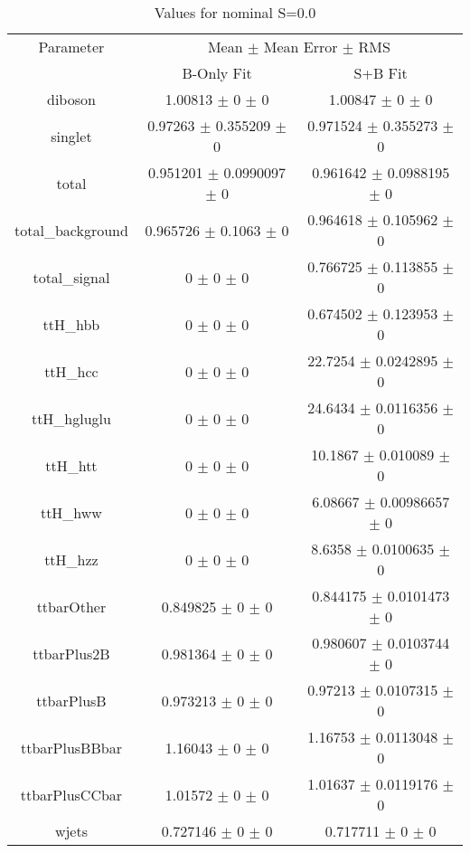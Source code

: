 \begin{table}
\centering
\caption{Values for nominal S=0.0}
\begin{tabular}{ccc}
\toprule
Parameter & \multicolumn{2}{c}{Mean $\pm$ Mean Error $\pm$ RMS}\\
 & B-Only Fit & S+B Fit\\
\midrule
diboson & \num{1.00813} $\pm$ \num{0} $\pm$ \num{0} & \num{1.00847} $\pm$ \num{0} $\pm$ \num{0}\\
singlet & \num{0.97263} $\pm$ \num{0.355209} $\pm$ \num{0} & \num{0.971524} $\pm$ \num{0.355273} $\pm$ \num{0}\\
total & \num{0.951201} $\pm$ \num{0.0990097} $\pm$ \num{0} & \num{0.961642} $\pm$ \num{0.0988195} $\pm$ \num{0}\\
total\_background & \num{0.965726} $\pm$ \num{0.1063} $\pm$ \num{0} & \num{0.964618} $\pm$ \num{0.105962} $\pm$ \num{0}\\
total\_signal & \num{0} $\pm$ \num{0} $\pm$ \num{0} & \num{0.766725} $\pm$ \num{0.113855} $\pm$ \num{0}\\
ttH\_hbb & \num{0} $\pm$ \num{0} $\pm$ \num{0} & \num{0.674502} $\pm$ \num{0.123953} $\pm$ \num{0}\\
ttH\_hcc & \num{0} $\pm$ \num{0} $\pm$ \num{0} & \num{22.7254} $\pm$ \num{0.0242895} $\pm$ \num{0}\\
ttH\_hgluglu & \num{0} $\pm$ \num{0} $\pm$ \num{0} & \num{24.6434} $\pm$ \num{0.0116356} $\pm$ \num{0}\\
ttH\_htt & \num{0} $\pm$ \num{0} $\pm$ \num{0} & \num{10.1867} $\pm$ \num{0.010089} $\pm$ \num{0}\\
ttH\_hww & \num{0} $\pm$ \num{0} $\pm$ \num{0} & \num{6.08667} $\pm$ \num{0.00986657} $\pm$ \num{0}\\
ttH\_hzz & \num{0} $\pm$ \num{0} $\pm$ \num{0} & \num{8.6358} $\pm$ \num{0.0100635} $\pm$ \num{0}\\
ttbarOther & \num{0.849825} $\pm$ \num{0} $\pm$ \num{0} & \num{0.844175} $\pm$ \num{0.0101473} $\pm$ \num{0}\\
ttbarPlus2B & \num{0.981364} $\pm$ \num{0} $\pm$ \num{0} & \num{0.980607} $\pm$ \num{0.0103744} $\pm$ \num{0}\\
ttbarPlusB & \num{0.973213} $\pm$ \num{0} $\pm$ \num{0} & \num{0.97213} $\pm$ \num{0.0107315} $\pm$ \num{0}\\
ttbarPlusBBbar & \num{1.16043} $\pm$ \num{0} $\pm$ \num{0} & \num{1.16753} $\pm$ \num{0.0113048} $\pm$ \num{0}\\
ttbarPlusCCbar & \num{1.01572} $\pm$ \num{0} $\pm$ \num{0} & \num{1.01637} $\pm$ \num{0.0119176} $\pm$ \num{0}\\
wjets & \num{0.727146} $\pm$ \num{0} $\pm$ \num{0} & \num{0.717711} $\pm$ \num{0} $\pm$ \num{0}\\
\bottomrule
\end{tabular}
\end{table}